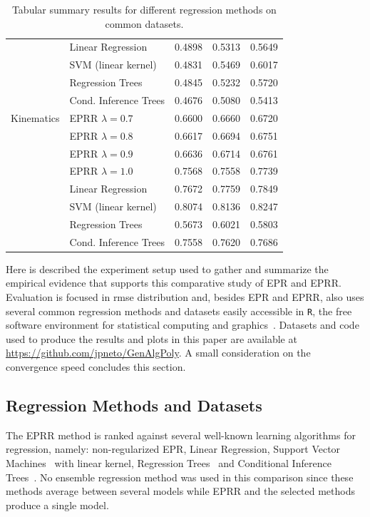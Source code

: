\documentclass[review,preprint]{elsarticle}
\begin{document}
\begin{table}[t]
\begin{tabular}{ll|ccc}
					 & Linear Regression 	& 0.4898 & 0.5313 & 0.5649 \\
					 & SVM (linear kernel) 	& 0.4831 & 0.5469 & 0.6017 \\
					 & Regression Trees 	& 0.4845 & 0.5232 & 0.5720 \\
					 & Cond. Inference Trees 	& 0.4676 & 0.5080 & 0.5413 \\
		\hline
		Kinematics	 & EPRR $\lambda = 0.7$ 	& 0.6600 & 0.6660 & 0.6720 \\
					 & EPRR $\lambda = 0.8$ 	& 0.6617 & 0.6694 & 0.6751 \\
					 & EPRR $\lambda = 0.9$ 	& 0.6636 & 0.6714 & 0.6761 \\
					 & EPRR $\lambda = 1.0$ 	& 0.7568 & 0.7558 & 0.7739 \\
					 & Linear Regression 	& 0.7672 & 0.7759 & 0.7849 \\
					 & SVM (linear kernel) 	& 0.8074 & 0.8136 & 0.8247 \\
					 & Regression Trees 	& 0.5673 & 0.6021 & 0.5803 \\
					 & Cond. Inference Trees 	& 0.7558 & 0.7620 & 0.7686
	\end{tabular}
	\caption{Tabular summary results for different regression methods on common datasets.}
\end{table}
Here is described the experiment setup used to gather and summarize the empirical evidence that supports this comparative study of \ac{EPR} and \ac{EPRR}. Evaluation is focused in \ac{rmse} distribution and, besides \ac{EPR} and \ac{EPRR}, also uses several common regression methods and datasets easily accessible in \texttt{R}, the free software environment for statistical computing and graphics~\citep{R-Core-Team:2013aa}. Datasets and code used to produce the results and plots in this paper are available at \url{https://github.com/jpneto/GenAlgPoly}. A small consideration on the convergence speed concludes this section.

\subsection{Regression Methods and Datasets}

The \ac{EPRR} method is ranked against several well-known learning algorithms for regression, namely: non-regularized \ac{EPR}, Linear Regression, Support Vector Machines~\citep{Meyer:2012aa} with linear kernel, Regression Trees~\citep{Therneau:2013aa} and Conditional Inference Trees~\citep{Hothorn:2006aa,Strobl:2008aa,Strobl:2007aa}. No ensemble regression method was used in this comparison since these methods average between several models while \ac{EPRR} and the selected methods produce a single model.
%
%
\end{document}
